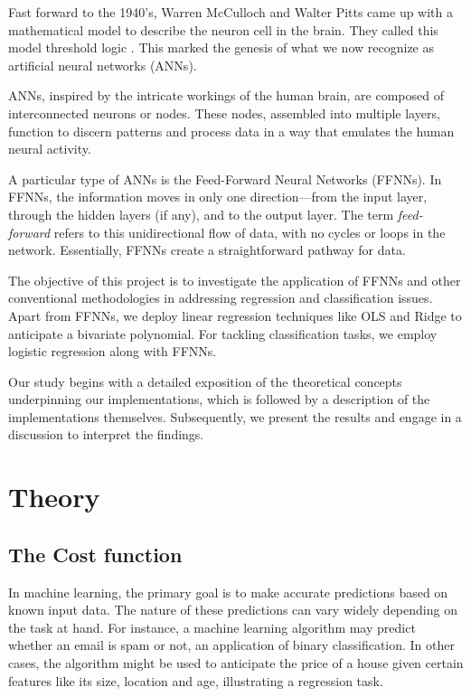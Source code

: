 \documentclass{article}
\theoremstyle{definition}
\begin{document}
Fast forward to the 1940's, Warren McCulloch and Walter Pitts came up with a mathematical model to describe the neuron cell in the brain. They called this model threshold logic \parencite{mcculloch1943logical}. This marked the genesis of what we now recognize as artificial neural networks (ANNs).

ANNs, inspired by the intricate workings of the human brain, are composed of interconnected neurons or nodes. These nodes, assembled into multiple layers, function to discern patterns and process data in a way that emulates the human neural activity.

A particular type of ANNs is the Feed-Forward Neural Networks (FFNNs). In FFNNs, the information moves in only one direction—from the input layer, through the hidden layers (if any), and to the output layer. The term \textit{feed-forward} refers to this unidirectional flow of data, with no cycles or loops in the network. Essentially, FFNNs create a straightforward pathway for data.

The objective of this project is to investigate the application of FFNNs and other conventional methodologies in addressing regression and classification issues. Apart from FFNNs, we deploy linear regression techniques like OLS and Ridge to anticipate a bivariate polynomial. For tackling classification tasks, we employ logistic regression along with FFNNs.

Our study begins with a detailed exposition of the theoretical concepts underpinning our implementations, which is followed by a description of the implementations themselves. Subsequently, we present the results and engage in a discussion to interpret the findings.


\newpage

\section{Theory}

\subsection{The Cost function}
In machine learning, the primary goal is to make accurate predictions based on known input data. The nature of these predictions can vary widely depending on the task at hand. For instance, a machine learning algorithm may predict whether an email is spam or not, an application of binary classification. In other cases, the algorithm might be used to anticipate the price of a house given certain features like its size, location and age, illustrating a regression task.
\end{document}
